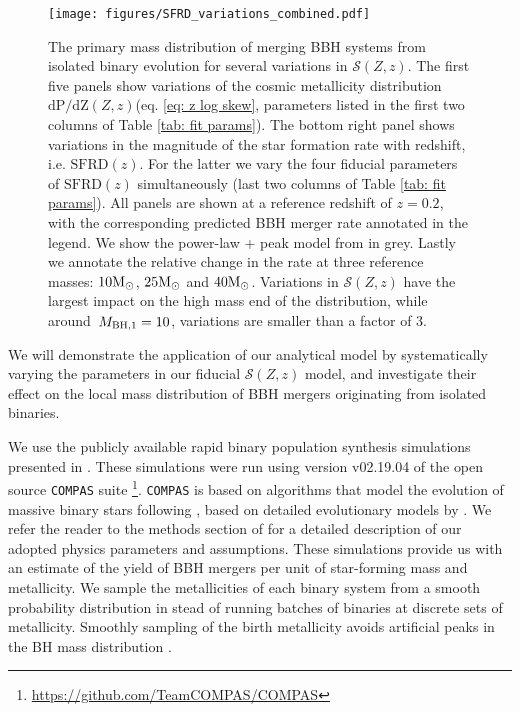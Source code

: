 \documentclass[twocolumn]{aastex631}
\newcommand{\Msun}{\ensuremath{\rm{M}_{\odot}}\xspace}
\newcommand{\Mbheen}{\ensuremath{\,M_{\rm BH, 1}}\xspace}
\newcommand{\SFRDzZ}{\ensuremath{\mathcal{S}(Z,z)}\xspace}
\newcommand{\SFRDz}{\ensuremath{\mathrm{SFRD}(z)}\xspace}
\newcommand{\dpdZ}{\ensuremath{\mathrm{dP/dZ}(Z,z)}\xspace}
\newcommand{\COMPAS}{{\tt COMPAS}\xspace}
\begin{document}
\begin{figure*}
\centering
{}
\texttt{[image: figures/SFRD\_variations\_combined.pdf]}
\caption{The primary mass distribution of merging BBH systems from isolated binary evolution for several variations in \SFRDzZ. 
The first five panels show variations of the cosmic metallicity distribution  \dpdZ (eq. \ref{eq: z log skew}, parameters listed in the first two columns of Table \ref{tab: fit params}). The bottom right panel shows variations in the magnitude of the star formation rate with redshift, i.e. \SFRDz. For the latter we vary the four fiducial parameters of \SFRDz simultaneously (last two columns of Table \ref{tab: fit params}). All panels are shown at a reference redshift of $z=0.2$, with the corresponding predicted BBH merger rate annotated in the legend. We show the power-law + peak model from \protect\cite{GWTC3_popPaper2021} in grey. Lastly we annotate the relative change in the rate at three reference masses: $10\Msun$, $25\Msun$ and $40\Msun$. Variations in \SFRDzZ have the largest impact on the high mass end of the distribution, while around $\Mbheen=10$, variations are smaller than a factor of 3.  
  \label{fig: mass dists}}
\end{figure*}

We will demonstrate the application of our analytical model by systematically varying the parameters in our fiducial \SFRDzZ model, and investigate their effect on the local mass distribution of BBH mergers originating from isolated binaries. 


We use the publicly available rapid binary population synthesis simulations presented in \cite{vanson+2022}. 
These simulations were run using version v02.19.04 of the open source \COMPAS suite \citep{COMPAS_method} \footnote{\url{https://github.com/TeamCOMPAS/COMPAS}}. \COMPAS is based on algorithms that model the evolution of massive binary stars following \citet{Hurley+2000, Hurley+2002}, based on detailed evolutionary models by \citet{Pols+1998}.  We refer the reader to the methods section of \cite{vanson+2022} for a detailed description of our adopted physics parameters and assumptions.
%
These simulations provide us with an estimate of the yield of BBH mergers per unit of star-forming mass and metallicity. 
We sample the metallicities of each binary system from a smooth probability distribution in stead of running batches of binaries at discrete sets of metallicity. Smoothly sampling of the birth metallicity avoids artificial peaks in the BH mass distribution \citep[e.g.][]{Dominik2015,Kummer_thesis}. 
\end{document}
